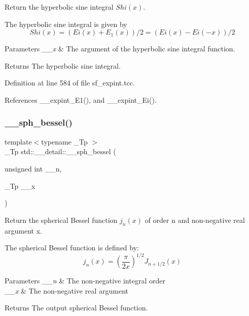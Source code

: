 Return the hyperbolic sine integral $ Shi(x) $. 

The hyperbolic sine integral is given by \[ Shi(x) = (Ei(x) + E_1(x))/2 = (Ei(x) - Ei(-x))/2 \]


\begin{DoxyParams}{Parameters}
{\em \+\_\+\+\_\+x} & The argument of the hyperbolic sine integral function. \\
\hline
\end{DoxyParams}
\begin{DoxyReturn}{Returns}
The hyperbolic sine integral. 
\end{DoxyReturn}


Definition at line 584 of file sf\+\_\+expint.\+tcc.



References \+\_\+\+\_\+expint\+\_\+\+E1(), and \+\_\+\+\_\+expint\+\_\+\+Ei().

\mbox{\label{namespacestd_1_1____detail_ac2ae8a144f79bd793e1b5d80a3b082b1}} 
\subsubsection{\texorpdfstring{\+\_\+\+\_\+sph\+\_\+bessel()}{\_\_sph\_bessel()}\hspace{0.1cm}{\footnotesize\ttfamily [1/2]}}
{\footnotesize\ttfamily template$<$typename \+\_\+\+Tp $>$ \\
\+\_\+\+Tp std\+::\+\_\+\+\_\+detail\+::\+\_\+\+\_\+sph\+\_\+bessel (\begin{DoxyParamCaption}\item[{unsigned int}]{\+\_\+\+\_\+n,  }\item[{\+\_\+\+Tp}]{\+\_\+\+\_\+x }\end{DoxyParamCaption})}



Return the spherical Bessel function $ j_n(x) $ of order n and non-\/negative real argument {\ttfamily x}. 

The spherical Bessel function is defined by\+: \[ j_n(x) = \left(\frac{\pi}{2x} \right) ^{1/2} J_{n+1/2}(x) \]


\begin{DoxyParams}{Parameters}
{\em \+\_\+\+\_\+n} & The non-\/negative integral order \\
\hline
{\em \+\_\+\+\_\+x} & The non-\/negative real argument \\
\hline
\end{DoxyParams}
\begin{DoxyReturn}{Returns}
The output spherical Bessel function. 
\end{DoxyReturn}


